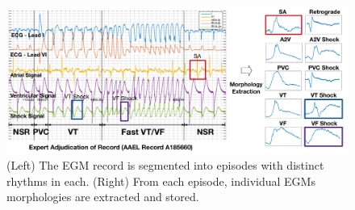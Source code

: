 \begin{figure}[t]
	\centering
	\vspace{-10pt}
	\includegraphics[scale=0.35]{figures/figadjudication.pdf}
	\vspace{-10pt}
	\caption{\small  (Left) The \ac{EGM} record is segmented into episodes with distinct rhythms in each. (Right) From each episode, individual \acp{EGM} morphologies are extracted and stored.
	}
	\label{fig:adjudication}
\end{figure}

